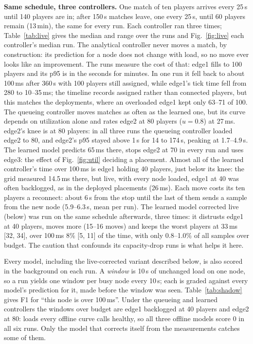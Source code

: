 \documentclass[conference]{IEEEtran}
\begin{document}
\textbf{Same schedule, three controllers.} One match of ten players arrives
every 25\,s until 140 players are in; after 150\,s matches leave, one every
25\,s, until 60 players remain
(13\,min), the same for every run. Each controller ran three times; Table~\ref{tab:live} gives the
median and range over the runs and Fig.~\ref{fig:live} each controller's
median run. The analytical
controller never moves a match, by construction: its prediction for a node
does not change with load, so no move ever looks like an improvement. The
runs measure the cost of that: edge1 fills to 100 players and its p95 is in
the seconds for minutes. In one run it fell back to about 100\,ms after
360\,s with 100 players still assigned, while edge1's tick time fell from
280 to 10--35\,ms; the timeline records assigned rather than connected
players, but this matches the deployments, where an overloaded edge1 kept
only 63--71 of 100. The queueing controller moves matches as often as the
learned one, but its curve depends on utilization alone and rates edge2 at
80 players ($u=0.8$) at 27\,ms. edge2's knee is at 80 players: in all three
runs the queueing controller loaded edge2 to 80, and edge2's p95 stayed above
1\,s for 14 to 174\,s, peaking at 1.7--4.9\,s. The learned model predicts
65\,ms there, stops edge2 at 70 in every run and uses edge3: the effect of
Fig.~\ref{fig:util} deciding a placement. Almost all of the learned
controller's time over 100\,ms is edge1 holding 40 players, just below its knee: the
grid measured 14.5\,ms there, but live, with every node loaded, edge1 at 40
was often backlogged, as in the deployed placements (26\,ms). Each move costs
its ten players a reconnect: about 6\,s from the stop until the last of them
sends a sample from the new node (5.9--6.3\,s, mean per run). The
learned model corrected live (below) was run on the same schedule
afterwards, three times: it distrusts edge1 at 40 players, moves more
(15--16 moves) and keeps the worst players at 33\,ms [32, 34], over 100\,ms
8\% [5, 11] of the time, with only 0.8--1.0\% of all samples over budget.
The caution that confounds its capacity-drop runs is what helps it here.

Every model, including the live-corrected variant described below, is also
scored in the background on each run. A \emph{window} is
10\,s of unchanged load on one node, so a run yields one window per busy
node every 10\,s; each is graded against every model's prediction for it,
made before the window was seen. Table~\ref{tab:shadow} gives F1 for ``this
node is over 100\,ms''. Under the queueing and learned controllers the
windows over budget are edge1 backlogged at 40 players and edge2 at 80: loads
every offline curve calls healthy, so all three offline models score 0 in
all six runs. Only the model that corrects itself from the measurements
catches some of them.
\end{document}
